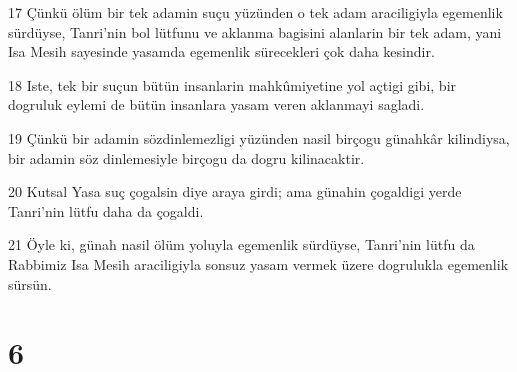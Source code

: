 \par 17 Çünkü ölüm bir tek adamin suçu yüzünden o tek adam araciligiyla egemenlik sürdüyse, Tanri'nin bol lütfunu ve aklanma bagisini alanlarin bir tek adam, yani Isa Mesih sayesinde yasamda egemenlik sürecekleri çok daha kesindir.
\par 18 Iste, tek bir suçun bütün insanlarin mahkûmiyetine yol açtigi gibi, bir dogruluk eylemi de bütün insanlara yasam veren aklanmayi sagladi.
\par 19 Çünkü bir adamin sözdinlemezligi yüzünden nasil birçogu günahkâr kilindiysa, bir adamin söz dinlemesiyle birçogu da dogru kilinacaktir.
\par 20 Kutsal Yasa suç çogalsin diye araya girdi; ama günahin çogaldigi yerde Tanri'nin lütfu daha da çogaldi.
\par 21 Öyle ki, günah nasil ölüm yoluyla egemenlik sürdüyse, Tanri'nin lütfu da Rabbimiz Isa Mesih araciligiyla sonsuz yasam vermek üzere dogrulukla egemenlik sürsün.

\chapter{6}

